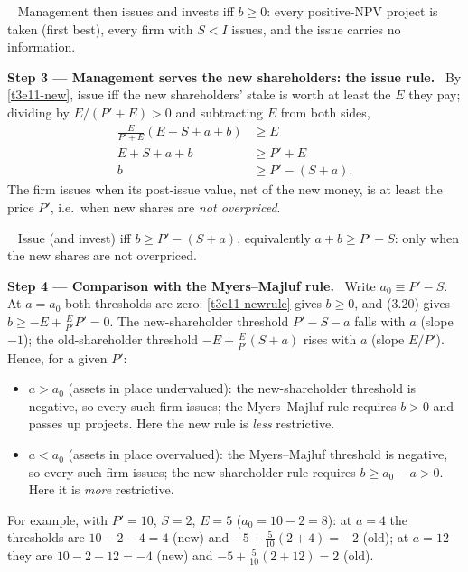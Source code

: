 \documentclass[11pt,a4paper]{article}
\newcommand{\step}[2]{\par\medskip\noindent\textbf{Step #1 --- #2.}~}
\newcommand{\answer}[1]{\par\smallskip\noindent\fbox{\textbf{Answer #1.}}~}
\begin{document}
\answer{(a)} Management then issues and invests iff $b\ge0$: every positive-NPV project is taken (first best), every firm with $S<I$ issues, and the issue carries no information.

\step{3}{Management serves the new shareholders: the issue rule} By \eqref{t3e11-new}, issue iff the new shareholders' stake is worth at least the $E$ they pay; dividing by $E/(P'+E)>0$ and subtracting $E$ from both sides,
\begin{align}
  \frac{E}{P'+E}(E+S+a+b) &\ge E \nonumber\\
  E+S+a+b &\ge P'+E \nonumber\\
  b &\ge P'-(S+a). \label{t3e11-newrule}
\end{align}
The firm issues when its post-issue value, net of the new money, is at least the price $P'$, i.e.\ when
new shares are \emph{not overpriced}.

\answer{(b)} Issue (and invest) iff $b\ge P'-(S+a)$, equivalently $a+b\ge P'-S$: only when the new shares are not overpriced.

\step{4}{Comparison with the Myers--Majluf rule} Write $a_0\equiv P'-S$. At $a=a_0$ both thresholds are
zero: \eqref{t3e11-newrule} gives $b\ge0$, and (3.20) gives $b\ge-E+\frac{E}{P'}P'=0$. The new-shareholder
threshold $P'-S-a$ falls with $a$ (slope $-1$); the old-shareholder threshold
$-E+\frac{E}{P'}(S+a)$ rises with $a$ (slope $E/P'$). Hence, for a given $P'$:
\begin{itemize}
  \item $a>a_0$ (assets in place undervalued): the new-shareholder threshold is negative, so every such firm
        issues; the Myers--Majluf rule requires $b>0$ and passes up projects. Here the new rule is \emph{less} restrictive.
  \item $a<a_0$ (assets in place overvalued): the Myers--Majluf threshold is negative, so every such firm
        issues; the new-shareholder rule requires $b\ge a_0-a>0$. Here it is \emph{more} restrictive.
\end{itemize}
For example, with $P'=10$, $S=2$, $E=5$ ($a_0=10-2=8$): at $a=4$ the thresholds are $10-2-4=4$ (new) and $-5+\frac{5}{10}(2+4)=-2$ (old); at
$a=12$ they are $10-2-12=-4$ (new) and $-5+\frac{5}{10}(2+12)=2$ (old).
\end{document}
